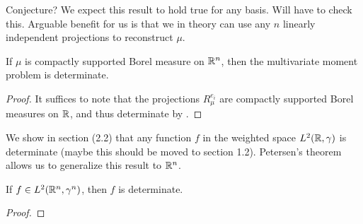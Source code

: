\begin{remark}
  Conjecture? We expect this result to hold true for any basis. Will have to check this. Arguable benefit for us is that we in theory can use any $n$ linearly independent projections to reconstruct $\mu$.
\end{remark}

\begin{corollary}
  If $\mu$ is compactly supported Borel measure on $\mathbb{R}^n$, then the multivariate moment problem is determinate.
\end{corollary}

\begin{proof}
  It suffices to note that the projections $R_\mu^{e_i}$ are compactly supported Borel measures on $\mathbb{R}$, and thus determinate by \cn.
\end{proof}


We show in section (2.2) that any function $f$ in the weighted space $L^2(\mathbb{R}, \gamma)$ is determinate (maybe this should be moved to section 1.2). Petersen's theorem allows us to generalize this result to $\mathbb{R}^n$.

\begin{corollary}
  If $f \in L^2(\mathbb{R}^n, \gamma^n)$, then $f$ is determinate.
\end{corollary}

\begin{proof}
  \pn
\end{proof}
